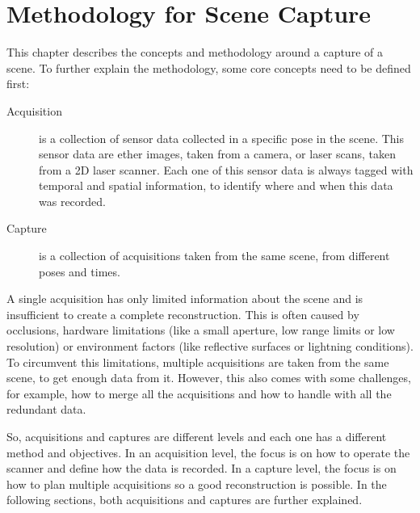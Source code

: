 \chapter{Methodology for Scene Capture}
\label{chapter:scene_capture_methodology}

This chapter describes the concepts and methodology around a capture of a scene. To further explain the methodology, some core concepts need to be defined first:

\begin{description}
    
    \item[Acquisition]
        is a collection of sensor data collected in a specific pose in the scene. This sensor data are ether images, taken from a camera, or laser scans, taken from a 2D laser scanner. Each one of this sensor data is always tagged with temporal and spatial information, to identify where and when this data was recorded.
    
    \item[Capture]
        is a collection of acquisitions taken from the same scene, from different poses and times.

\end{description}

A single acquisition has only limited information about the scene and is insufficient to create a complete reconstruction. This is often caused by occlusions, hardware limitations (like a small aperture, low range limits or low resolution) or environment factors (like reflective surfaces or lightning conditions). To circumvent this limitations, multiple acquisitions are taken from the same scene, to get enough data from it. However, this also comes with some challenges, for example, how to merge all the acquisitions and how to handle with all the redundant data.

So, acquisitions and captures are different levels and each one has a different method and objectives. In an acquisition level, the focus is on how to operate the scanner and define how the data is recorded. In a capture level, the focus is on how to plan multiple acquisitions so a good reconstruction is possible. In the following sections, both acquisitions and captures are further explained.







